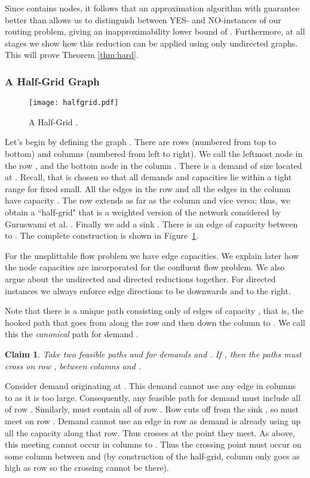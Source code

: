 \documentclass[12pt]{article}
\newtheorem{claim}{Claim}[section]
\newcommand{\qed}{}
\begin{document}
Since  contains  nodes, it follows that an approximation algorithm with guarantee better than
  allows us to distinguish between YES- and NO-instances of our
routing problem, giving an inapproximability lower bound of .
Furthermore, at all stages we  show how this reduction can be applied using
only undirected graphs.  This will prove Theorem \ref{thm:hard}.



\subsubsection{A Half-Grid Graph }

\begin{figure}[th]
\begin{center}
\texttt{[image: halfgrid.pdf]}
\caption{\label{fig.grid} A Half-Grid .}
\end{center}
\end{figure}


Let's begin by defining the graph .  There are  rows (numbered from
top to bottom) and  columns (numbered from left to right). We call the leftmost node in the  row , and
the bottom node in the  column . There is a demand of size   located at .
Recall, that  is chosen so that all demands and capacities
lie within a tight range  for fixed  small. All the edges
in the  row and all the edges in the  column have capacity
.  The  row extends as far as the  column and vice
versa; thus, we obtain a ``half-grid" that is a weighted version of the
network considered by Guruswami et al. \cite{guruswami2003near}.  Finally we add a sink .
There is an edge of capacity  between  to . The
complete construction is shown in Figure~\ref{fig.grid}.

For the unsplittable flow problem we have edge capacities. We explain later how the node capacities
are incorporated for the confluent flow problem. We also argue about the undirected and directed reductions together.
For directed instances we always enforce  edge directions to be downwards
and to the right.


Note that there is a unique  path  consisting only of edges of
capacity , that is, the hooked path that goes from  along the
 row and then down the  column to . We call this the {\em canonical} path
for demand .

\begin{claim}\label{cl:cross}
Take two feasible paths  and  for demands  and .
If , then the paths must cross on row , between columns  and .
\end{claim}
Consider demand  originating at . This demand cannot
use any edge in columns  to  as it is too large.
Consequently, any feasible path  for demand  must include all of row .
Similarly,  must contain all of row . Row  cuts off  from the sink , so
 must meet  on row .
Demand  cannot use an edge in row  as demand  is already using up all the capacity along that row.
Thus  crosses  at the point they meet. As above, this meeting cannot occur
in columns  to . Thus the crossing point must occur on some column between  and 
(by construction of the half-grid, column  only goes as high as row  so the crossing cannot be there).
\qed
\end{document}
